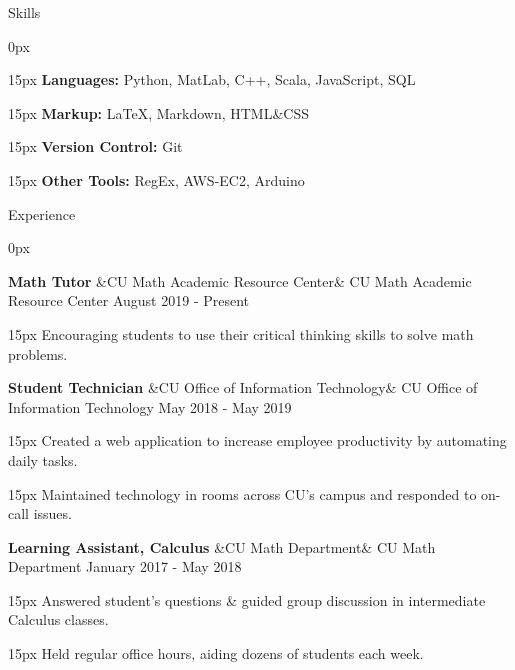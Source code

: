 \documentclass{article}
\newcommand{\sectionIndent}{15px}
\newcommand{\sectionHeader}[1]{
    \vspace{4px}
    \sffamily \color{primary} \Large
    #1
    \color{black}
    \rmfamily
    \hrulefill
    \vspace{3px}
}
\newcommand{\itemHeader}[3]{
    \vspace{6px}
    \Large \textbf{#1}
    \normalsize
    \ifx&#3&
    \else
        \vspace{2px}
        \sffamily \color{light}
        #3
        \rmfamily \color{black}
    \fi
    \color{primary}
    \hfill \sffamily#2 \rmfamily
    \color{black}

}
\newcommand{\itemContent}[1]{
    \vspace{4px} \normalsize
    \begin{addmargin}{\sectionIndent}
        #1
        \vspace{1px}
    \end{addmargin}
}
\begin{document}
\sectionHeader{Skills}
    \begin{addmargin}[\sectionIndent]{0px}
        \itemContent{\textbf{Languages:} Python, MatLab, C++, Scala, JavaScript, SQL}
        \itemContent{\textbf{Markup:} \LaTeX , Markdown, HTML\&CSS}
        \itemContent{\textbf{Version Control:} Git}
        \itemContent{\textbf{Other Tools:} RegEx, AWS-EC2, Arduino}
    \end{addmargin}

\sectionHeader{Experience}
    \begin{addmargin}[\sectionIndent]{0px}
        \itemHeader{Math Tutor}{August 2019 - Present}{CU Math Academic Resource Center}
        \itemContent{Encouraging students to use their critical thinking skills to solve math problems.}

        \itemHeader{Student Technician}{May 2018 - May 2019}{CU Office of Information Technology}
        \itemContent{Created a web application to increase employee productivity by automating daily tasks.}
        \itemContent{Maintained technology in rooms across CU’s campus and responded to on-call issues.}

        \itemHeader{Learning Assistant, Calculus}{January 2017 - May 2018}{CU Math Department}
        \itemContent{Answered student's questions \& guided group discussion in intermediate Calculus classes.}
        \itemContent{Held regular office hours, aiding dozens of students each week.}
    \end{addmargin}
\end{document}

